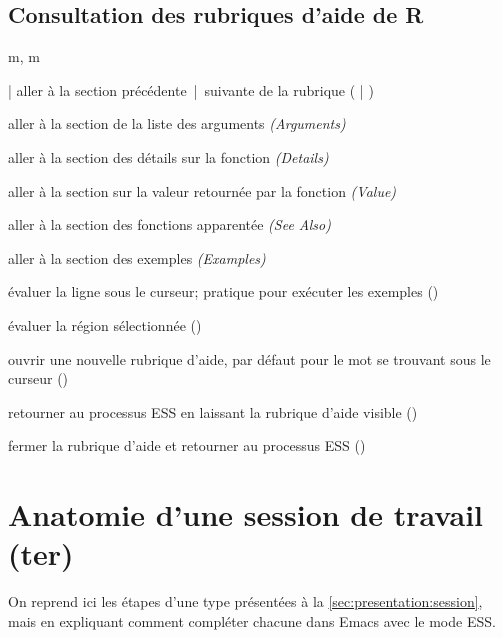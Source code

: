 \subsection{Consultation des rubriques d'aide de R}
\label{sec:emacs+ess:commandes:aide}

\begin{ttscript}{m, m}
  \raggedright
\item[\code{p} | \code{n}] aller à la section précédente~|~suivante de
  la rubrique ( |
  )
\item[\code{s a}] aller à la section de la liste des arguments \emph{(Arguments)}
\item[\code{s D}] aller à la section des détails sur la fonction \emph{(Details)}
\item[\code{s v}] aller à la section sur la valeur retournée par la
  fonction \emph{(Value)}
\item[\code{s s}] aller à la section des fonctions apparentée \emph{(See Also)}
\item[\code{s e}] aller à la section des exemples \emph{(Examples)}
\item[\code{l}] évaluer la ligne sous le curseur; pratique pour
  exécuter les exemples ()
\item[\code{r}] évaluer la région sélectionnée ()
\item[\code{h}] ouvrir une nouvelle rubrique d'aide, par défaut pour le
  mot se trouvant sous le curseur ()
\item[\code{q}] retourner au processus ESS en laissant la rubrique
  d'aide visible ()
\item[\code{x}] fermer la rubrique d'aide et retourner au processus ESS
  ()
\end{ttscript}



\section{Anatomie d'une session de travail (ter)}
\label{sec:emacs+ess:session}

On reprend ici les étapes d'une %
type présentées à la \autoref{sec:presentation:session}, mais en
expliquant comment compléter chacune dans Emacs avec le mode ESS.

